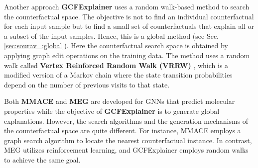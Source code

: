 Another approach \textbf{GCFExplainer} \cite{Global-counter} uses a random walk-based method to search the counterfactual space. The objective is not to find an individual counterfactual for each input sample but to find a small set of counterfactuals that explain all or a subset of the input samples. Hence, this is a global method (see Sec. \ref{sec:sourav_:global}). Here the counterfactual search space is obtained by applying graph edit operations on the training data. The method uses a  random walk called \textbf{Vertex Reinforced Random Walk (VRRW)} \cite{pemantle1992vertex}, which is a modified version of a Markov chain where the state transition probabilities depend on the number of previous visits to that state.




Both \textbf{MMACE} \cite{agnostic-counter} and \textbf{MEG} \cite{meg-counter} are developed for GNNs that predict molecular properties while the objective of \textbf{GCFExplainer} \cite{Global-counter} is to generate global explanations. However, the search algorithms and the generation mechanisms of the counterfactual space are quite different. For instance, MMACE employs a graph search algorithm to locate the nearest counterfactual instance. In contrast, MEG utilizes reinforcement learning, and GCFExplainer employs random walks to achieve the same goal.


